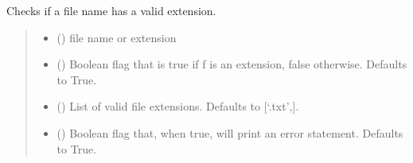 \documentclass[letterpaper,10pt,english]{sphinxmanual}
\begin{document}
\begin{fulllineitems}
\begin{fulllineitems}
\label{\detokenize{Setup.Inputs:Setup.Inputs.GetUserInput.UserInput.CheckFileExt}}
\pysigstartsignatures
{}
\pysigstopsignatures
\sphinxAtStartPar
Checks if a file name has a valid extension.
\begin{quote}\begin{description}
\begin{itemize}
\item {} 
\sphinxAtStartPar
{} () \textendash{} file name or extension

\item {} 
\sphinxAtStartPar
{} (\sphinxstyleliteralemphasis{\sphinxupquote{, }}) \textendash{} Boolean flag that is true if f is an extension, false                 otherwise. Defaults to True.

\item {} 
\sphinxAtStartPar
{} (\sphinxstyleliteralemphasis{\sphinxupquote{{[}}}\sphinxstyleliteralemphasis{\sphinxupquote{{]}}}\sphinxstyleliteralemphasis{\sphinxupquote{, }}) \textendash{} List of valid file extensions. Defaults to                 {[}‘.txt’,{]}.

\item {} 
\sphinxAtStartPar
{} (\sphinxstyleliteralemphasis{\sphinxupquote{, }}) \textendash{} Boolean flag that, when true, will print an error                 statement. Defaults to True.


\end{itemize}
\end{description}
\end{quote}
\end{fulllineitems}
\end{fulllineitems}
\end{document}
